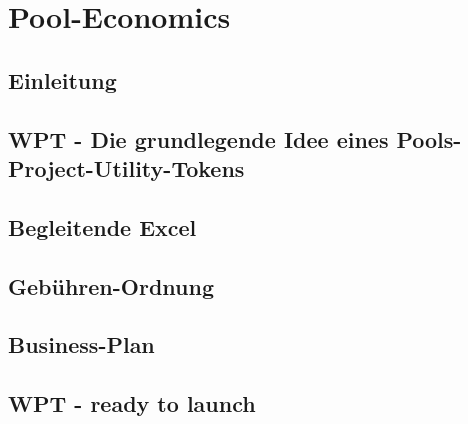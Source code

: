 \documentclass[11pt]{scrartcl}
\begin{document}
\section{Pool-Economics}
\vspace{0.3cm}


\subsection{Einleitung}
\vspace{0.2cm}
\vspace{0.5cm}

\subsection{WPT - Die grundlegende Idee eines Pools-Project-Utility-Tokens}
\label{sec:wpt-design}
\vspace{0.2cm}
%
\vspace{0.5cm}

\subsection{Begleitende Excel}
\label{sec:excel}
\vspace{0.2cm}
\vspace{0.5cm}

\subsection{Gebühren-Ordnung}
\label{sec:fees}
\vspace{0.2cm}

\vspace{0.5cm}

\subsection{Business-Plan}
\label{sec:bp}
\vspace{0.2cm}
\vspace{0.5cm}

\subsection{WPT - ready to launch}
\label{sec:wpt}
\vspace{0.2cm}
\vspace{0.5cm}


\end{document}
